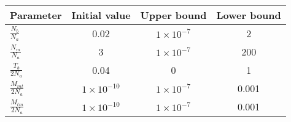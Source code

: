 \documentclass[12pt,letterpaper]{article}
\begin{document}
\begin{table}[h!]  
 \def\arraystretch{2}
 \begin{center}
 \begin{tabular}{l|c|c|c}
   \bf Parameter & \bf Initial value & \bf Upper bound & \bf Lower bound\\ \hline 
   $\frac{N_b}{N_a}$ & 0.02 & $1\times10^{-7}$ & 2 \\ 
   $\frac{N_{m}}{N_a}$ & 3 & $1\times10^{-7}$ & 200 \\
   $\frac{T_b}{2N_a}$ & 0.04 & 0  & 1 \\ 
   $\frac{M_{mt}}{2N_a}$ & $1\times10^{-10}$ & $1\times10^{-7}$ & 0.001 \\
   $\frac{M_{tm}}{2N_a}$ & $1\times10^{-10}$ & $1\times10^{-7}$ & 0.001 \\
 \end{tabular}
 \def\arraystretch{1} %
 \end{center}
\end{table}
\end{document}
